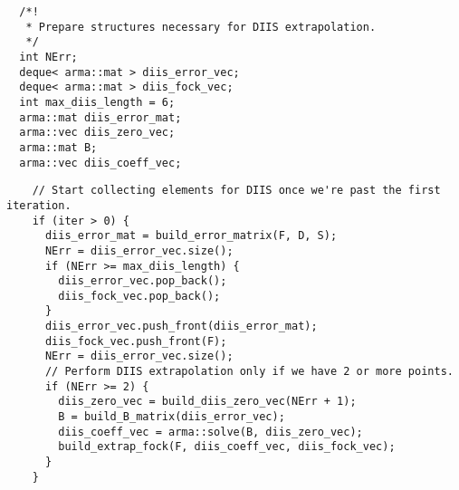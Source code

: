 \documentclass{article}
\begin{document}
\begin{verbatim}
  /*!
   * Prepare structures necessary for DIIS extrapolation.
   */
  int NErr;
  deque< arma::mat > diis_error_vec;
  deque< arma::mat > diis_fock_vec;
  int max_diis_length = 6;
  arma::mat diis_error_mat;
  arma::vec diis_zero_vec;
  arma::mat B;
  arma::vec diis_coeff_vec;
\end{verbatim}

\begin{verbatim}
    // Start collecting elements for DIIS once we're past the first iteration.
    if (iter > 0) {
      diis_error_mat = build_error_matrix(F, D, S);
      NErr = diis_error_vec.size();
      if (NErr >= max_diis_length) {
        diis_error_vec.pop_back();
        diis_fock_vec.pop_back();
      }
      diis_error_vec.push_front(diis_error_mat);
      diis_fock_vec.push_front(F);
      NErr = diis_error_vec.size();
      // Perform DIIS extrapolation only if we have 2 or more points.
      if (NErr >= 2) {
        diis_zero_vec = build_diis_zero_vec(NErr + 1);
        B = build_B_matrix(diis_error_vec);
        diis_coeff_vec = arma::solve(B, diis_zero_vec);
        build_extrap_fock(F, diis_coeff_vec, diis_fock_vec);
      }
    }
\end{verbatim}
\end{document}
